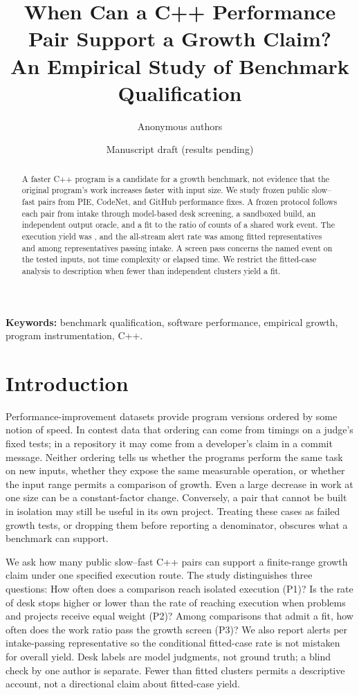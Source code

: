 \documentclass[11pt]{article}
\title{When Can a C++ Performance Pair Support a Growth Claim?\\
An Empirical Study of Benchmark Qualification}
\author{Anonymous authors}
\date{Manuscript draft (results pending)}
\begin{document}
\maketitle

\begin{abstract}
A faster C++ program is a candidate for a growth benchmark, not evidence
that the original program's work increases faster with input size.
We study \BenchPairs{} frozen public slow--fast pairs from PIE, CodeNet, and
GitHub performance fixes. A frozen protocol follows each pair from intake
through model-based desk screening, a sandboxed build, an independent output
oracle, and a fit to the ratio of counts of a shared work event. The
execution yield was \BenchExecRate, and the all-stream alert rate was
\BenchFitAlertRate{} among fitted representatives and \BenchIntakeAlertRate{}
among representatives passing intake. \BenchAbstractTakeaway{} A screen pass
concerns the named event on the tested inputs, not time complexity or
elapsed time. We restrict the fitted-case analysis to description when
fewer than \BenchMinFits{} independent clusters yield a fit.
\end{abstract}

\noindent\textbf{Keywords:} benchmark qualification, software performance,
empirical growth, program instrumentation, C++.

\section{Introduction}

Performance-improvement datasets provide program versions ordered by some
notion of speed. In contest data that ordering can come from timings on a
judge's fixed tests; in a repository it may come from a developer's claim in a
commit message. Neither ordering tells us whether the programs perform the same
task on new inputs, whether they expose the same measurable operation, or
whether the input range permits a comparison of growth. Even a large decrease
in work at one size can be a constant-factor change. Conversely, a pair that
cannot be built in isolation may still be useful in its own project. Treating
these cases as failed growth tests, or dropping them before reporting a
denominator, obscures what a benchmark can support.

We ask how many public slow--fast C++ pairs can support a finite-range
growth claim under one specified execution route. The study distinguishes
three questions: How often does a comparison reach isolated execution (P1)?
Is the rate of desk stops higher or lower than the rate of reaching execution
when problems and projects receive equal weight (P2)? Among comparisons
that admit a fit, how often does the work ratio pass the growth
screen (P3)? We also report alerts per intake-passing representative so the
conditional fitted-case rate is not mistaken for overall yield. Desk labels
are model judgments, not ground truth; a blind check by one author is
separate. Fewer than \BenchMinFits{} fitted clusters permits a descriptive
account, not a directional claim about fitted-case yield.
\end{document}
